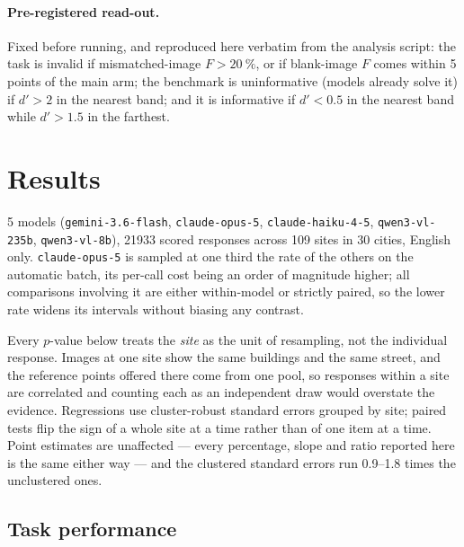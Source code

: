 \documentclass[10pt,a4paper]{article}
\begin{document}
\paragraph{Pre-registered read-out.} Fixed before running, and reproduced here
verbatim from the analysis script: the task is invalid if mismatched-image
$F > \SI{20}{\percent}$, or if blank-image $F$ comes within \num{5} points of
the main arm; the benchmark is uninformative (models already solve it) if
$d' > 2$ in the nearest band; and it is informative if $d' < 0.5$ in the
nearest band while $d' > 1.5$ in the farthest.

\section{Results}

\num{5} models (\texttt{gemini-3.6-flash}, \texttt{claude-opus-5},
\texttt{claude-haiku-4-5}, \texttt{qwen3-vl-235b}, \texttt{qwen3-vl-8b}),
\num{21933} scored responses across \num{109} sites in \num{30} cities, English
only. \texttt{claude-opus-5} is sampled at one third the rate of the others on
the automatic batch, its per-call cost being an order of magnitude higher; all
comparisons involving it are either within-model or strictly paired, so the
lower rate widens its intervals without biasing any contrast.

Every $p$-value below treats the \emph{site} as the unit of resampling, not the
individual response. Images at one site show the same buildings and the same
street, and the reference points offered there come from one pool, so responses
within a site are correlated and counting each as an independent draw would
overstate the evidence. Regressions use cluster-robust standard errors grouped
by site; paired tests flip the sign of a whole site at a time rather than of
one item at a time. Point estimates are unaffected --- every percentage, slope
and ratio reported here is the same either way --- and the clustered standard
errors run \numrange{0.9}{1.8} times the unclustered ones.

\label{sec:results-hint}

\subsection{Task performance}
\label{sec:task-perf}
\end{document}

